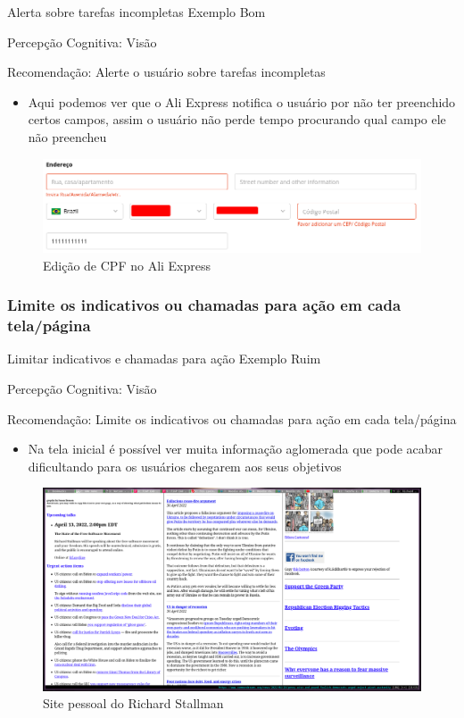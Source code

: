 \documentclass{beamer}
\begin{document}
\begin{frame}{Alerta sobre tarefas incompletas Exemplo Bom}

Percepção Cognitiva: Visão

Recomendação: Alerte o usuário sobre tarefas incompletas

\begin{itemize}
    \item Aqui podemos ver que o Ali Express notifica o usuário por não ter preenchido certos campos, assim o usuário não perde tempo procurando qual campo ele não preencheu
\end{itemize}
\begin{figure}
    \centering
    \includegraphics[scale=0.3]{images/Ali-express.png}
    \caption{Edição de CPF no Ali Express}
\end{figure}

\end{frame}


\subsubsection{Limite os indicativos ou chamadas para ação em cada tela/página}
\begin{frame}{Limitar indicativos e chamadas para ação Exemplo Ruim}

Percepção Cognitiva: Visão

Recomendação: Limite os indicativos ou chamadas para ação em cada tela/página

\begin{itemize}
    \item Na tela inicial é possível ver muita informação aglomerada que pode acabar dificultando para os usuários chegarem aos seus objetivos
\end{itemize}
\begin{figure}
    \centering
    \includegraphics[scale=0.15]{images/rsman.png}
    \caption{Site pessoal do Richard Stallman}
\end{figure}
\end{frame}
\end{document}
